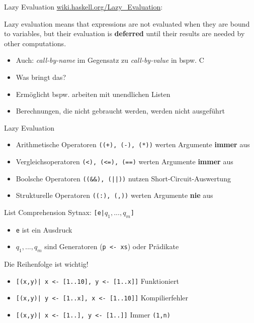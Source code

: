 \documentclass{beamer}
\begin{document}
\begin{frame}{Lazy Evaluation}
      \href{https://wiki.haskell.org/Lazy\_evaluation}{wiki.haskell.org/Lazy\_Evaluation}:

	\begin{displayquote}
		Lazy evaluation means that expressions are not evaluated when they are bound to variables, but their evaluation is \textbf{deferred} until their results are needed by other computations.
	\end{displayquote}

	\begin{itemize}
		\item Auch: \emph{call-by-name} im Gegensatz zu \emph{call-by-value} in bspw. C
		\item Was bringt das?
		\pause
		\item Ermöglicht bspw. arbeiten mit unendlichen Listen
		\item Berechnungen, die nicht gebraucht werden, werden nicht ausgeführt
	\end{itemize}
\end{frame}

\begin{frame}{Lazy Evaluation}
    \begin{itemize}
        \item Arithmetische Operatoren \texttt{((+), (-), (*))} werten Argumente \textbf{immer} aus
        \item Vergleichsoperatoren \texttt{(<), (<=), (==)} werten Argumente \textbf{immer} aus
        \item Boolsche Operatoren \texttt{((&&), (||))} nutzen Short-Circuit-Auswertung
        \item Strukturelle Operatoren \texttt{((:), (,))} werten Argumente \textbf{nie} aus
    \end{itemize}
\end{frame}

\begin{frame}{List Comprehension}
    Sytnax: \texttt{[e|$q_1,...,q_m$]}
    \begin{itemize}
        \item \texttt{e} ist ein Ausdruck
        \item \texttt{$q_1,...,q_m$} sind Generatoren (\texttt{p <- xs}) oder Prädikate
    \end{itemize}
    \pause
    Die Reihenfolge ist wichtig!
    \begin{itemize}
        \item \texttt{[(x,y)| x <- [1..10], y <- [1..x]]} Funktioniert
        \item \texttt{[(x,y)| y <- [1..x], x <- [1..10]]} Kompilierfehler
        \item \texttt{[(x,y)| x <- [1..], y <- [1..]]} Immer \texttt{(1,n)}
    \end{itemize}
\end{frame}
\end{document}
